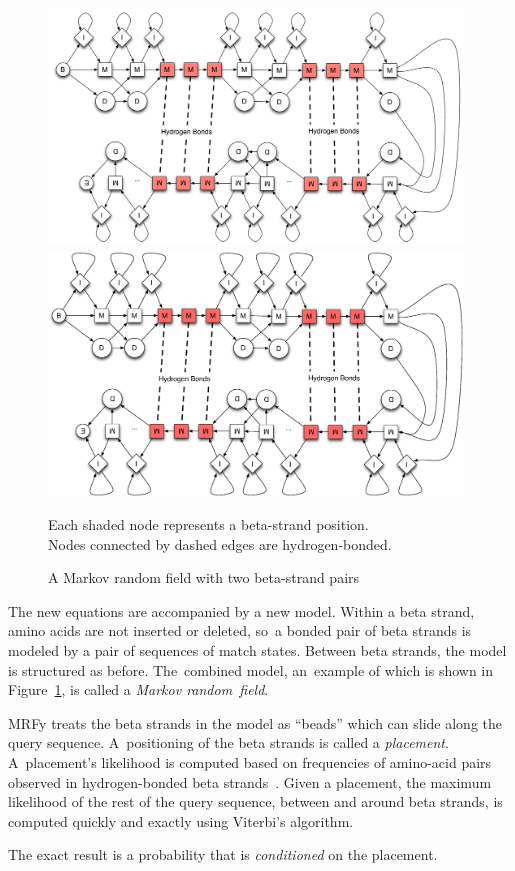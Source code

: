 \documentclass[]{jfp1}
\newcommand\figref[1]{Figure~\ref{fig:#1}}
\newcommand\figlabel[1]{\label{fig:#1}}
\let\cite\citep
\begin{document}
\begin{figure}
\ifpdfmadness
\centerline{\includegraphics[width=11cm]{mrf_interleave_diagram.pdf}} 
\else
\centerline{\includegraphics[width=11cm]{mrf_interleave_diagram.eps}} 
\fi
Each shaded node represents a beta-strand position.\\
Nodes connected by dashed edges are hydrogen-bonded.

\smallskip

\caption{A Markov random field with two beta-strand pairs}
\figlabel{mrf} 
\end{figure}



The new equations are accompanied by a new model.
Within a beta strand, amino acids are not inserted or deleted, so~a
bonded pair of beta strands is modeled by 
 a pair of sequences of match states.
Between beta strands, the model is structured as before.
The~combined model, an~example of which is shown in \figref{mrf}, is called a
\textit{Markov random~field}. 


%
%
MRFy treats the beta 
strands in the model
 as ``beads'' which can slide along the query sequence.
A~positioning of the beta strands is called
 a \emph{placement}.
A~placement's likelihood is computed
based on frequencies of amino-acid pairs observed in 
hydrogen-bonded beta strands~\cite{Cowen:2002p588}.
Given a placement, the maximum likelihood of the rest of
the query sequence, between and around beta strands,
is computed quickly and exactly 
using Viterbi's algorithm.
\iffalse
This likelihood is \emph{conditioned} on the placement.
\else
The exact result is a probability that is
\emph{conditioned} on the placement.
\fi
\end{document}
